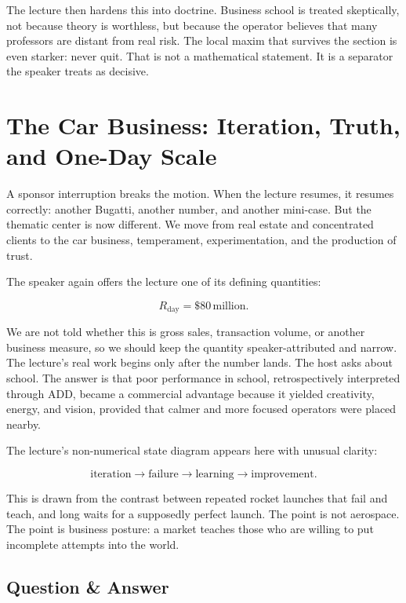 The lecture then hardens this into doctrine. Business school is treated skeptically, not because theory is worthless, but because the operator believes that many professors are distant from real risk. The local maxim that survives the section is even starker: never quit. That is not a mathematical statement. It is a separator the speaker treats as decisive.

\section{The Car Business: Iteration, Truth, and One-Day Scale}

A sponsor interruption breaks the motion. When the lecture resumes, it resumes correctly: another Bugatti, another number, and another mini-case. But the thematic center is now different. We move from real estate and concentrated clients to the car business, temperament, experimentation, and the production of trust.

The speaker again offers the lecture one of its defining quantities:

\begin{equation}
R_{\text{day}}=\$80\,\text{million}.
\end{equation}

We are not told whether this is gross sales, transaction volume, or another business measure, so we should keep the quantity speaker-attributed and narrow. The lecture's real work begins only after the number lands. The host asks about school. The answer is that poor performance in school, retrospectively interpreted through ADD, became a commercial advantage because it yielded creativity, energy, and vision, provided that calmer and more focused operators were placed nearby.

The lecture's non-numerical state diagram appears here with unusual clarity:

\begin{equation}
\text{iteration}\to\text{failure}\to\text{learning}\to\text{improvement}.
\end{equation}

This is drawn from the contrast between repeated rocket launches that fail and teach, and long waits for a supposedly perfect launch. The point is not aerospace. The point is business posture: a market teaches those who are willing to put incomplete attempts into the world.

\subsection{Question \& Answer}

